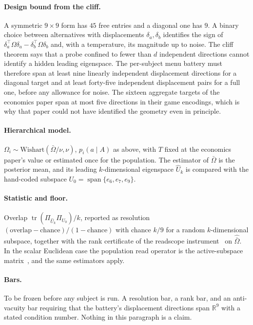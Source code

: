 \documentclass[11pt]{article}
\theoremstyle{definition}
\theoremstyle{remark}
\newcommand{\R}{\mathbb{R}}
\newcommand{\tr}{\operatorname{tr}}
\begin{document}
\paragraph{Design bound from the cliff.}
A symmetric $9\times9$ form has $45$ free entries and a diagonal one has $9$.
A binary choice between alternatives with displacements $\delta_{a},\delta_{b}$ identifies the sign of $\delta_{a}^{\top}\Omega\delta_{a}-\delta_{b}^{\top}\Omega\delta_{b}$ and, with a temperature, its magnitude up to noise.
The cliff theorem says that a probe confined to fewer than $d$ independent directions cannot identify a hidden leading eigenspace.
The per-subject menu battery must therefore span at least nine linearly independent displacement directions for a diagonal target and at least forty-five independent displacement pairs for a full one, before any allowance for noise.
The sixteen aggregate targets of the economics paper span at most five directions in their game encodings, which is why that paper could not have identified the geometry even in principle.

\paragraph{Hierarchical model.}
$\Omega_{i}\sim\mathrm{Wishart}(\bar{\Omega}/\nu,\nu)$, $p_{i}(a\mid A)$ as above, with $T$ fixed at the economics paper's value or estimated once for the population.
The estimator of $\bar{\Omega}$ is the posterior mean, and its leading $k$-dimensional eigenspace $\hat{U}_{k}$ is compared with the hand-coded subspace $U_{0}=\operatorname{span}\{e_{6},e_{7},e_{9}\}$.

\paragraph{Statistic and floor.}
Overlap $\tr(\Pi_{\hat{U}_{k}}\Pi_{U_{0}})/k$, reported as resolution $(\text{overlap}-\text{chance})/(1-\text{chance})$ with chance $k/9$ for a random $k$-dimensional subspace, together with the rank certificate of the readscope instrument~\cite{bond2026readscope} on $\hat{\bar{\Omega}}$. In the scalar Euclidean case the population read operator is the active-subspace matrix~\cite{constantine2015}, and the same estimators apply.

\paragraph{Bars.}
To be frozen before any subject is run. A resolution bar, a rank bar, and an anti-vacuity bar requiring that the battery's displacement directions span $\R^{9}$ with a stated condition number.
Nothing in this paragraph is a claim.
\end{document}
